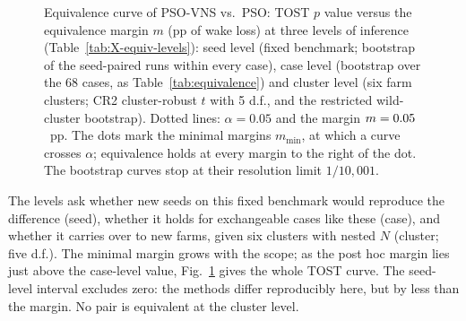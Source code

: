 \begingroup\swResRefs
{}
\begin{figure}[!t]
\centering
{}
\caption{Equivalence curve of PSO-VNS vs.\ PSO: TOST $p$ value versus the equivalence margin $m$ (pp of wake loss) at three levels of inference (Table~\ref{tab:X-equiv-levels}): seed level (fixed benchmark; bootstrap of the seed-paired runs within every case), case level (bootstrap over the 68 cases, as Table~\ref{tab:equivalence}) and cluster level (six farm clusters; CR2 cluster-robust $t$ with 5 d.f., and the restricted wild-cluster bootstrap). Dotted lines: $\alpha=0.05$ and the margin $m=0.05$~pp. The dots mark the minimal margins $m_{\min}$, at which a curve crosses $\alpha$; equivalence holds at every margin to the right of the dot. The bootstrap curves stop at their resolution limit $1/10{,}001$.}
\label{fig:equiv-curve}
\end{figure}
\endgroup
The levels ask whether new seeds on this fixed benchmark would reproduce the difference (seed), whether it holds for exchangeable cases like these (case), and whether it carries over to new farms, given six clusters with nested $N$ (cluster; five d.f.). The minimal margin grows with the scope; as the post hoc margin lies just above the case-level value, Fig.~\ref{fig:equiv-curve} gives the whole TOST curve. The seed-level interval excludes zero: the methods differ reproducibly here, but by less than the margin. No pair is equivalent at the cluster level.

